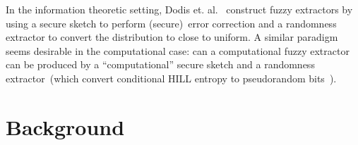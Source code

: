\documentclass[11pt]{article}
\newcommand{\secref}[1]{\mbox{Section~\ref{#1}}}
\newcommand{\defref}[1]{\mbox{Definition~\ref{#1}}}
\newcommand{\hill}{\ensuremath{\mathtt{HILL}}\xspace}
\newcommand{\yao}{\ensuremath{\mathtt{Yao}}\xspace}
\newcommand{\unp}{\ensuremath{\mathtt{unp}}\xspace}
\newtheorem{lemma}[theorem]{Lemma}
\newtheorem{definition}[theorem]{Definition}
\begin{document}
{In the information theoretic setting, Dodis et. al.~\cite{DBLP:journals/siamcomp/DodisORS08} construct fuzzy extractors by using a secure sketch to perform (secure)~error correction and a randomness extractor to convert the distribution to close to uniform.  A similar paradigm seems desirable in the computational case: can a computational fuzzy extractor can be produced by a ``computational'' secure sketch and a randomness extractor~(which convert conditional HILL entropy to pseudorandom bits~\cite[Lemma 5]{DBLP:conf/eurocrypt/HsiaoLR07}).
}


\appendix
\section{Background}
\end{document}
